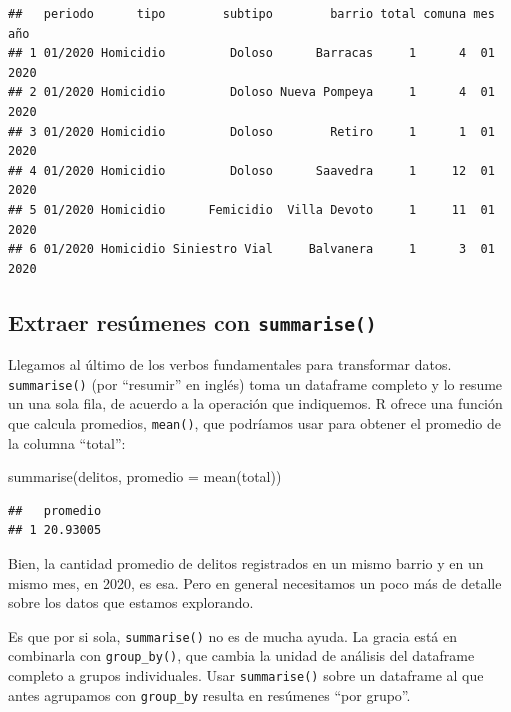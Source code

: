 \documentclass[
]{book}
\newenvironment{Shaded}{\begin{snugshade}}{\end{snugshade}}
\newcommand{\AttributeTok}[1]{\textcolor[rgb]{0.77,0.63,0.00}{#1}}
\newcommand{\FunctionTok}[1]{\textcolor[rgb]{0.00,0.00,0.00}{#1}}
\newcommand{\NormalTok}[1]{#1}
\begin{document}
\begin{verbatim}
##   periodo      tipo        subtipo        barrio total comuna mes  año
## 1 01/2020 Homicidio         Doloso      Barracas     1      4  01 2020
## 2 01/2020 Homicidio         Doloso Nueva Pompeya     1      4  01 2020
## 3 01/2020 Homicidio         Doloso        Retiro     1      1  01 2020
## 4 01/2020 Homicidio         Doloso      Saavedra     1     12  01 2020
## 5 01/2020 Homicidio      Femicidio  Villa Devoto     1     11  01 2020
## 6 01/2020 Homicidio Siniestro Vial     Balvanera     1      3  01 2020
\end{verbatim}

\hypertarget{extraer-resuxfamenes-con-summarise}{%
\subsection{\texorpdfstring{Extraer resúmenes con \texttt{summarise()}}{Extraer resúmenes con summarise()}}\label{extraer-resuxfamenes-con-summarise}}

Llegamos al último de los verbos fundamentales para transformar datos. \texttt{summarise()} (por ``resumir'' en inglés) toma un dataframe completo y lo resume un una sola fila, de acuerdo a la operación que indiquemos. R ofrece una función que calcula promedios, \texttt{mean()}, que podríamos usar para obtener el promedio de la columna ``total'':

\begin{Shaded}
\begin{Highlighting}[]
\FunctionTok{summarise}\NormalTok{(delitos, }\AttributeTok{promedio =} \FunctionTok{mean}\NormalTok{(total))}
\end{Highlighting}
\end{Shaded}

\begin{verbatim}
##   promedio
## 1 20.93005
\end{verbatim}

Bien, la cantidad promedio de delitos registrados en un mismo barrio y en un mismo mes, en 2020, es esa. Pero en general necesitamos un poco más de detalle sobre los datos que estamos explorando.

Es que por si sola, \texttt{summarise()} no es de mucha ayuda. La gracia está en combinarla con \texttt{group\_by()}, que cambia la unidad de análisis del dataframe completo a grupos individuales. Usar \texttt{summarise()} sobre un dataframe al que antes agrupamos con \texttt{group\_by} resulta en resúmenes ``por grupo''.
\end{document}
